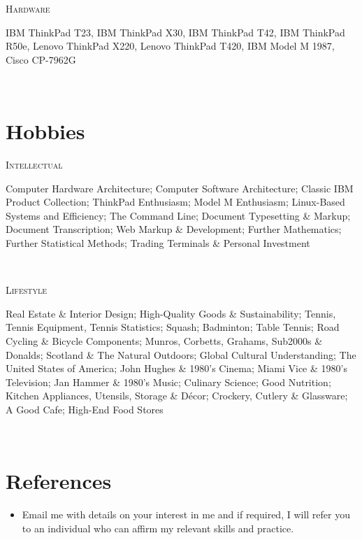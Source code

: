 \documentclass[11pt, english]{article}
\begin{document}
{\begin{minipage}[t]{.15\linewidth}
        \hfill                  
        \textsc{Hardware}    
\end{minipage}
\hfill\vline\hfill
\begin{minipage}[t]{.80\linewidth}
	IBM ThinkPad T23, IBM ThinkPad X30, IBM ThinkPad T42, IBM ThinkPad R50e, Lenovo ThinkPad X220, Lenovo ThinkPad T420, IBM Model M 1987, Cisco CP-7962G
\end{minipage}\\

\section*{Hobbies}

\begin{minipage}[t]{.15\linewidth}
        \hfill                  
        \textsc{Intellectual}    
\end{minipage}
\hfill\vline\hfill
\begin{minipage}[t]{.80\linewidth}
	Computer Hardware Architecture; Computer Software Architecture; Classic IBM Product Collection; ThinkPad Enthusiasm; Model M Enthusiasm; Linux-Based Systems and Efficiency; The Command Line; Document Typesetting \& Markup; Document Transcription; Web Markup \& Development; Further Mathematics; Further Statistical Methods; Trading Terminals \& Personal Investment
\end{minipage}\\

\begin{minipage}[t]{.15\linewidth}
        \hfill                  
	\textsc{Lifestyle}      
\end{minipage}
\hfill\vline\hfill
\begin{minipage}[t]{.80\linewidth}
	Real Estate \& Interior Design; High-Quality Goods \& Sustainability; Tennis, Tennis Equipment, Tennis Statistics; Squash; Badminton; Table Tennis; Road Cycling \& Bicycle Components; Munros, Corbetts, Grahams, Sub2000s \& Donalds; Scotland \& The Natural Outdoors; Global Cultural Understanding; The United States of America; John Hughes \& 1980's Cinema; Miami Vice \& 1980's Television; Jan Hammer \& 1980's Music; Culinary Science; Good Nutrition; Kitchen Appliances, Utensils, Storage \& D\'{e}cor; Crockery, Cutlery \& Glassware; A Good Cafe; High-End Food Stores
\end{minipage}\\

\section{References}

\begin{itemize}
\setlength\itemsep{0cm}
        \item Email me with details on your interest in me and if required, I will refer you to an individual who can affirm my relevant skills and practice.
\end{itemize}

}
\end{document}
